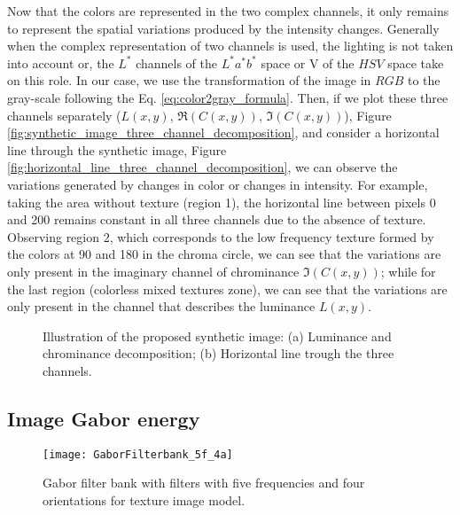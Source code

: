 Now that the colors are represented in the two complex channels, it only remains to represent the spatial variations produced by the intensity changes. Generally when the complex representation of two channels is used, the lighting is not taken into account or, the $L^*$ channels of the $L^*a^*b^*$ space or V of the $HSV$ space take on this role. In our case, we use the transformation of the image in $RGB$ to the gray-scale following the Eq. \eqref{eq:color2gray_formula}. Then, if we plot these three channels separately ($L(x,y)$, $\Re(C(x,y))$, $\Im(C(x,y))$), Figure \ref{fig:synthetic_image_three_channel_decomposition}, and consider a horizontal line through the synthetic image, Figure \ref{fig:horizontal_line_three_channel_decomposition}, we can observe the variations generated by changes in color or changes in intensity. For example, taking the area without texture (region 1), the horizontal line between pixels 0 and 200 remains constant in all three channels due to the absence of texture. Observing region 2, which corresponds to the low frequency texture formed by the colors at 90 and 180 in the chroma circle, we can see that the variations are only present in the imaginary channel of chrominance $\Im(C(x,y))$; while for the last region (colorless mixed textures zone), we can see that the variations are only present in the channel that describes the luminance $L(x,y)$.

\begin{figure}
\centering
\caption{Illustration of the proposed synthetic image: (a) Luminance and chrominance decomposition; (b) Horizontal line trough the three channels.}\label{fig:three_channel_decomposition}
\end{figure}

\subsection{Image Gabor energy}

\begin{figure}[!ht]
    \centering
    \texttt{[image: GaborFilterbank\_5f\_4a]}
    \caption{Gabor filter bank with filters with five frequencies and four orientations for texture image model.}\label{fig:gabrfilter_5f_4a}    
\end{figure}



